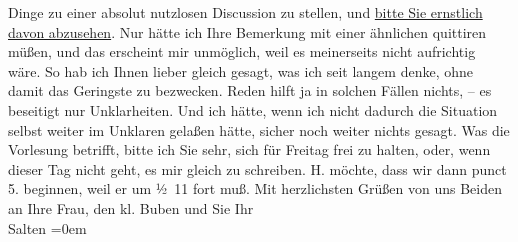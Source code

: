 \begin{ledgroupsized}[t]{13cm}
               Dinge zu einer absolut nutzlosen Discussion zu stellen, und \uline{bitte Sie ernstlich davon abzusehen}. Nur hätte ich Ihre Bemerkung mit
               einer ähnlichen quittiren müßen, und das erscheint mir unmöglich, weil es meinerseits
               nicht aufrichtig wäre. So hab ich Ihnen lieber gleich gesagt, was ich seit langem
               denke, ohne damit das Geringste zu bezwecken. Reden hilft ja in solchen Fällen
               nichts, – es beseitigt nur Unklarheiten. Und ich hätte, wenn ich nicht dadurch die
               Situation selbst weiter im Unklaren gelaßen hätte, sicher noch weiter nichts gesagt. \pend
           \pstart
           {\pb}Was die Vorlesung betrifft,
               bitte ich Sie sehr, sich für Freitag frei zu halten, oder, wenn dieser
               Tag nicht geht, es mir gleich zu schreiben. H.
               möchte, dass wir dann punct 5. beginnen, weil er um ½ 11
               fort muß. \pend
           \pstart
           Mit herzlichsten Grüßen von uns Beiden an Ihre Frau, den kl. Buben und Sie\pend
           \pstart
           Ihr {\\[\baselineskip]}\spacefill\mbox{Salten}\pend
           \leftskip=0em{}
         
         \endnumbering{}\end{ledgroupsized}\begin{anhang}\end{anhang}\newcommand{\dateiname}{L03347}\newcommand{\titel}{Felix Salten an Arthur Schnitzler, [12. 10. 1903]}\newcommand{\editorInnen}{Martin Anton Müller und Laura Untner}
      